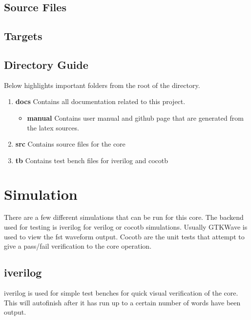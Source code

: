 \subsection{Source Files}



\subsection{Targets}



\subsection{Directory Guide}

\par
Below highlights important folders from the root of the directory.

\begin{enumerate}
  \item \textbf{docs} Contains all documentation related to this project.
    \begin{itemize}
      \item \textbf{manual} Contains user manual and github page that are generated from the latex sources.
    \end{itemize}
  \item \textbf{src} Contains source files for the core
  \item \textbf{tb} Contains test bench files for iverilog and cocotb
\end{enumerate}

\newpage

\section{Simulation}
\par
There are a few different simulations that can be run for this core. The backend used for testing is iverilog for verilog or cocotb simulations. Usually GTKWave is used to view the fst waveform output. Cocotb are the unit tests that attempt to give a pass/fail verification to the core operation.

\subsection{iverilog}
\par
iverilog is used for simple test benches for quick visual verification of the core. This will autofinish after it has
run up to a certain number of words have been output.

